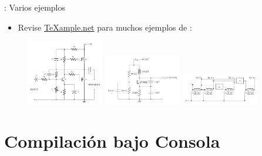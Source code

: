 \documentclass{beamer}
\begin{document}
\begin{frame}[fragile]{\insertsection: Varios ejemplos}
  \begin{itemize}
  \item Revise
    \href{http://texample.net}{\TeX{}ample.net} para
    muchos ejemplos de :
  \end{itemize}
  \begin{figure}
    \href{http://texample.net/tikz/examples/mosfet/}{%
      \includegraphics[width=0.3\textwidth]{mosfet}}
    \href{http://texample.net/tikz/examples/collpits/}{%
      \includegraphics[width=0.3\textwidth]{collpits}}
    \href{http://texample.net/tikz/examples/4-bit-counter/}{%
      \includegraphics[width=0.3\textwidth]{4-bit-counter}}
  \end{figure}
\end{frame}

\section{Compilación bajo Consola}
\end{document}
